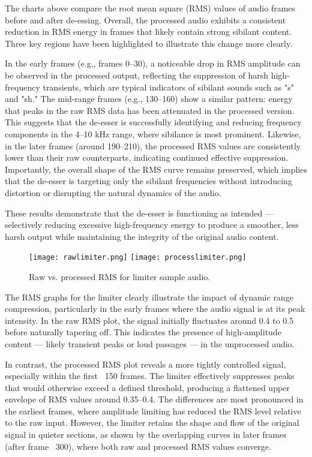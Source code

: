 \documentclass[conference]{IEEEtran}
\begin{document}
The charts above compare the root mean square (RMS) values of audio frames before and after de-essing. Overall, the processed audio exhibits a consistent reduction in RMS energy in frames that likely contain strong sibilant content. Three key regions have been highlighted to illustrate this change more clearly.

In the early frames (e.g., frames 0–30), a noticeable drop in RMS amplitude can be observed in the processed output, reflecting the suppression of harsh high-frequency transients, which are typical indicators of sibilant sounds such as "s" and "sh." The mid-range frames (e.g., 130–160) show a similar pattern: energy that peaks in the raw RMS data has been attenuated in the processed version. This suggests that the de-esser is successfully identifying and reducing frequency components in the 4–10 kHz range, where sibilance is most prominent. Likewise, in the later frames (around 190–210), the processed RMS values are consistently lower than their raw counterparts, indicating continued effective suppression. Importantly, the overall shape of the RMS curve remains preserved, which implies that the de-esser is targeting only the sibilant frequencies without introducing distortion or disrupting the natural dynamics of the audio.

These results demonstrate that the de-esser is functioning as intended — selectively reducing excessive high-frequency energy to produce a smoother, less harsh output while maintaining the integrity of the original audio content.

\begin{figure}[htbp]
    \centering
    \texttt{[image: rawlimiter.png]}
    \texttt{[image: processlimiter.png]}
    \caption{Raw vs. processed RMS for limiter sample audio.}
    \label{fig:figure2}
\end{figure}

The RMS graphs for the limiter clearly illustrate the impact of dynamic range compression, particularly in the early frames where the audio signal is at its peak intensity. In the raw RMS plot, the signal initially fluctuates around 0.4 to 0.5 before naturally tapering off. This indicates the presence of high-amplitude content — likely transient peaks or loud passages — in the unprocessed audio.

In contrast, the processed RMS plot reveals a more tightly controlled signal, especially within the first ~150 frames. The limiter effectively suppresses peaks that would otherwise exceed a defined threshold, producing a flattened upper envelope of RMS values around 0.35–0.4. The differences are most pronounced in the earliest frames, where amplitude limiting has reduced the RMS level relative to the raw input. However, the limiter retains the shape and flow of the original signal in quieter sections, as shown by the overlapping curves in later frames (after frame ~300), where both raw and processed RMS values converge.
\end{document}
